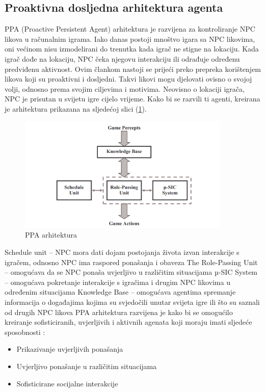 \documentclass[a4paper,12pt]{foi}
\begin{document}
\subsection{Proaktivna dosljedna arhitektura agenta}
PPA (Proactive Persistent Agent) arhitektura je razvijena za kontroliranje NPC likova u računalnim igrama. Iako danas postoji mnoštvo igara sa NPC likovima, oni većinom nisu izmodelirani do trenutka kada igrač ne stigne na lokaciju. Kada igrač dođe na lokaciju, NPC čeka njegovu interakciju ili odrađuje određenu predviđenu aktivnost. Ovim člankom nastoji se prijeći preko prepreka korištenjem likova koji su proaktivni i dosljedni. Takvi likovi mogu djelovati ovisno o svojoj volji, odnosno prema svojim ciljevima i motivima. Neovisno o lokaciji igrača, NPC je prisutan u svijetu igre cijelo vrijeme.
Kako bi se razvili ti agenti, kreirana je arhitektura prikazana na sljedećoj slici (\ref{slika-5}).
\begin{figure}[h]
\centering 
\includegraphics[width=0.90\textwidth]{ppa.png}
\caption{PPA arhitektura \citep{NameeB2004}}
\label{slika-5}
\end{figure}
\newpage

Schedule unit – NPC mora dati dojam postojanja života izvan interakcije s igračem, odnosno NPC ima raspored ponašanja i obaveza
\newline
The Role-Passing Unit – omogućava da se NPC ponaša uvjerljivo u različitim situacijama
\newline
µ-SIC System – omogućava pokretanje interakcije s igračima i drugim NPC likovima u određenim situacijama
\newline 
Knowledge Base – omogućava agentima spremanje informacija o događajima kojima su svjedočili unutar svijeta igre ili što su saznali od drugih NPC likova
\newline
PPA arhitektura razvijena je kako bi se omogućilo kreiranje sofisticiranih, uvjerljivih i aktivnih agenata koji moraju imati sljedeće sposobnosti \citep{NameeB2004}:
\begin{itemize}
\item Prikazivanje uvjerljivih ponašanja
\item Uvjerljivo ponašanje u različitim situacijama
\item Sofisticirane socijalne interakcije
\end{itemize}
\end{document}
